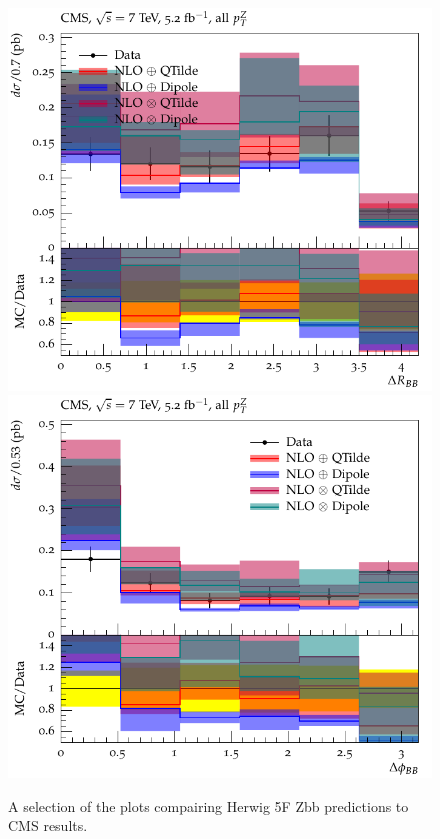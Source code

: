 \documentclass[11pt]{cernrep} \usepackage{graphicx,epsfig} 
\begin{document}
\begin{figure}[htbp]
   \includegraphics[scale=0.65]{figs/zbb/herwigzbb/d01-x01-y01.pdf} 
   \includegraphics[scale=0.65]{figs/zbb/herwigzbb/d02-x01-y01.pdf} 
\caption{A selection of the plots compairing Herwig 5F Zbb predictions to CMS results.}
\label{zbb-herwigzbb-cms}
\end{figure}
\end{document}
